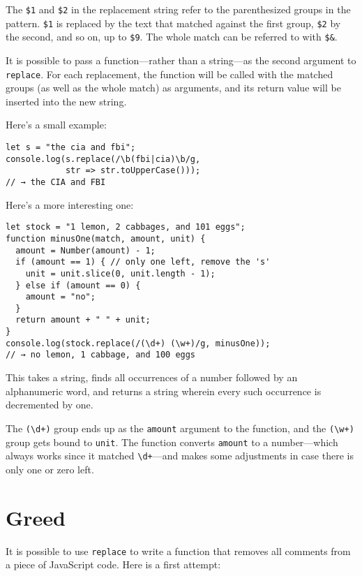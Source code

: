 The \lstinline`$1` and \lstinline`$2` in the replacement string refer to the parenthesized groups in the pattern. \lstinline`$1` is replaced by the text that matched against the first group, \lstinline`$2` by the second, and so on, up to \lstinline`$9`. The whole match can be referred to with \lstinline`$&`.

It is possible to pass a function—rather than a string—as the second argument to \lstinline`replace`. For each replacement, the function will be called with the matched groups (as well as the whole match) as arguments, and its return value will be inserted into the new string.

Here's a small example:

\begin{lstlisting}
let s = "the cia and fbi";
console.log(s.replace(/\b(fbi|cia)\b/g,
            str => str.toUpperCase()));
// → the CIA and FBI
\end{lstlisting}
\noindent

Here's a more interesting one:

\begin{lstlisting}
let stock = "1 lemon, 2 cabbages, and 101 eggs";
function minusOne(match, amount, unit) {
  amount = Number(amount) - 1;
  if (amount == 1) { // only one left, remove the 's'
    unit = unit.slice(0, unit.length - 1);
  } else if (amount == 0) {
    amount = "no";
  }
  return amount + " " + unit;
}
console.log(stock.replace(/(\d+) (\w+)/g, minusOne));
// → no lemon, 1 cabbage, and 100 eggs
\end{lstlisting}
\noindent

This takes a string, finds all occurrences of a number followed by an alphanumeric word, and returns a string wherein every such occurrence is decremented by one.

The \lstinline`(\d+)` group ends up as the \lstinline`amount` argument to the function, and the \lstinline`(\w+)` group gets bound to \lstinline`unit`. The function converts \lstinline`amount` to a number—which always works since it matched \lstinline`\d+`—and makes some adjustments in case there is only one or zero left.

\section{Greed}

It is possible to use \lstinline`replace` to write a function that removes all comments from a piece of JavaScript code. Here is a first attempt:

